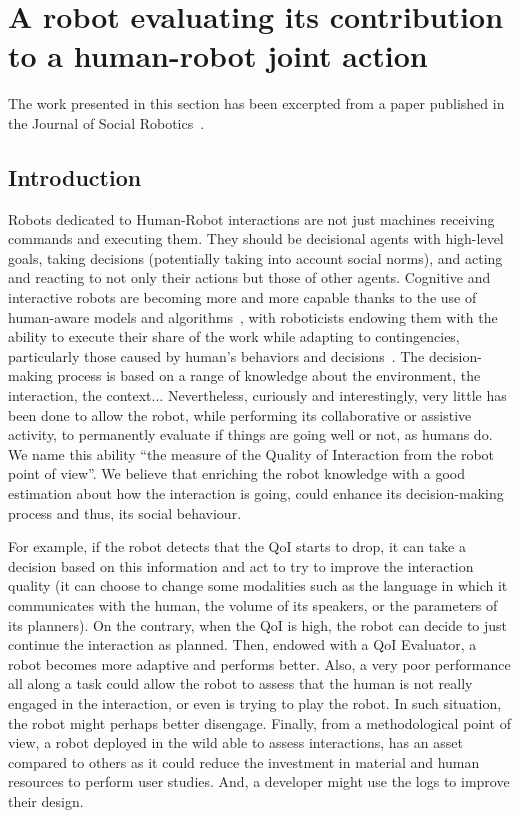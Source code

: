 \documentclass[a4paper,11pt,twoside]{StyleThese}
\begin{document}
\section{A robot evaluating its contribution to a human-robot joint action}\label{chap2:sec:qoi}

The work presented in this section has been excerpted from a paper published in the Journal of Social Robotics~\cite{mayima_2021_towards}.

\subsection{Introduction}

Robots dedicated to Human-Robot interactions are not just machines receiving commands and executing them. They should be decisional agents with high-level goals, taking decisions (potentially taking into account social norms), and acting and reacting to not only their actions but those of other agents. Cognitive and interactive robots are becoming more and more capable thanks to the use of human-aware models and algorithms~\cite{kruse2013,thomaz_2016_computational}, with roboticists endowing them with the ability to execute their share of the work while adapting to contingencies, particularly those caused by human's behaviors and decisions~\cite{hoffman_2007_fluency,cakmak_2017,lemaignan_2017_artificial}. The decision-making process is based on a range of knowledge about the environment, the interaction, the context... Nevertheless, curiously and interestingly, very little has been done to allow the robot, while performing its collaborative or assistive activity, to permanently evaluate if things are going well or not, as humans do. We name this ability ``the measure of the Quality of Interaction from the robot point of view''. We believe that enriching the robot knowledge with a good estimation about how the interaction is going, could enhance its decision-making process and thus, its social behaviour.

For example, if the robot detects that the QoI starts to drop, it can take a decision based on this information and act to try to improve the interaction quality (\eg it can choose to change some modalities such as the language in which it communicates with the human, the volume of its speakers, or the parameters of its planners). On the contrary, when the QoI is high, the robot can decide to just continue the interaction as planned. Then, endowed with a QoI Evaluator, a robot becomes more adaptive and performs better. Also, a very poor performance all along a task could allow the robot to assess that the human is not really engaged in the interaction, or even is trying to play the robot. In such situation, the robot might perhaps better disengage. 
Finally, from a methodological point of view, a robot deployed in the wild able to assess interactions, has an asset compared to others as it could reduce the investment in material and human resources to perform user studies. And, a developer might use the logs to improve their design. 
\end{document}
